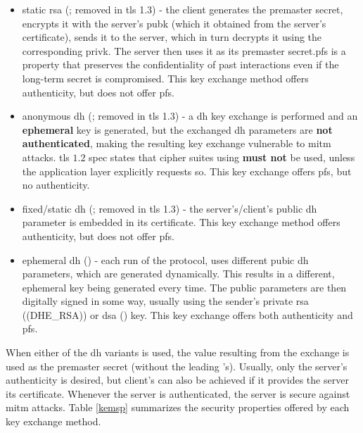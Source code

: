 \documentclass{llncs}
\begin{document}
\begin{itemize}
  \item static \gls{rsa} (; removed in \gls{tls} 1.3) - the client generates the premaster secret, encrypts it with the
  server's \gls{pubk} (which it obtained from the server's  certificate),
  sends it to the server, which in turn decrypts it using the corresponding \gls{privk}. The server then uses it as its premaster secret.\gls{pfs} is
  a property that preserves the confidentiality of past interactions even if the
  long-term secret is compromised. This key exchange method offers authenticity, but does not offer \gls{pfs}.
  \item anonymous \gls{dh} (; removed in \gls{tls} 1.3) - a \gls{dh} key exchange is
  performed and an \textbf{ephemeral} key is generated, but the exchanged \gls{dh}
  parameters are \textbf{not authenticated}, making the resulting key exchange
  vulnerable to \gls{mitm} attacks. \gls{tls} $1.2$ spec states that cipher suites
  using  \textbf{must not} be used, unless the application
  layer explicitly requests so. This key exchange offers \gls{pfs}, but no
  authenticity.
  \item fixed/static \gls{dh} (; removed in \gls{tls} 1.3) - the server's/client's public \gls{dh} parameter
  is embedded in its certificate. This key exchange method offers authenticity,
  but does not offer \gls{pfs}.
  \item ephemeral \gls{dh} () - each run of the protocol, uses
  different pubic \gls{dh} parameters, which are generated dynamically. This results
  in a different, ephemeral key being generated every time. The public parameters
  are then digitally signed in some way, usually using the sender's private
  \gls{rsa} (\codeword(DHE_RSA)) or \gls{dsa} () key. This key
  exchange offers both authenticity and \gls{pfs}.
\end{itemize}

When either of the \gls{dh} variants is used, the value resulting from the exchange is used
as the premaster secret (without the leading 's). Usually, only the server's
authenticity is desired, but client's can also be achieved if it provides the
server its certificate. Whenever the server is authenticated, the server is secure
against \gls{mitm} attacks. Table \ref{kemsp} summarizes the security properties
offered by each key exchange method.
\end{document}
